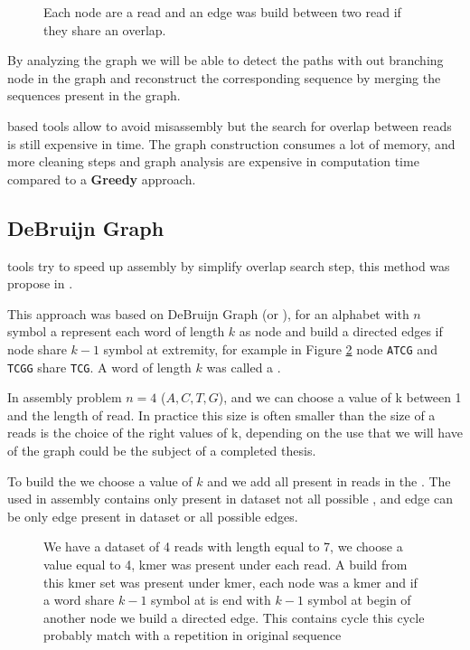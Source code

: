 \documentclass[./main.tex]{subfiles}
\begin{document}
\begin{figure}[ht]
    \centering 
    
    \caption{Each node are a read and an edge was build between two read if they share an overlap.}
    \label{intro:fig:olc:graph}
\end{figure}

By analyzing the graph we will be able to detect the paths with out branching node in the graph and reconstruct the corresponding sequence by merging the sequences present in the graph.

\OLC based tools allow to avoid misassembly but the search for overlap between reads is still expensive in time. The graph construction consumes a lot of memory, and more cleaning steps and graph analysis are expensive in computation time compared to a \textbf{Greedy} approach. 

\subsection{DeBruijn Graph}

\DBG tools try to speed up assembly by simplify overlap search step, this method was propose in \cite{eulerian_approach}.

This approach was based on DeBruijn Graph (or \DBG), for an alphabet with $n$ symbol a \DBG represent each word of length $k$ as node and build a directed edges if node share $k - 1$ symbol at extremity, for example in Figure \ref{intro:fig:dbg:graph} node \texttt{ATCG} and \texttt{TCGG} share \texttt{TCG}. A word of length $k$ was called a \kmer.

In assembly problem $n = 4$ (${A, C, T, G}$), and we can choose a value of k between 1 and the length of read. In practice this size is often smaller than the size of a reads is the choice of the right values of k, depending on the use that we will have of the \DBG graph could be the subject of a completed thesis.

To build the \DBG we choose a value of $k$ and we add all \kmer present in reads in the \DBG. The \DBG used in assembly contains only \kmer present in dataset not all possible \kmer, and edge can be only edge present in dataset or all possible edges.

\begin{figure}[ht]
    \center
    
    \caption{We have a dataset of 4 reads with length equal to 7, we choose a value equal to 4, kmer was present under each read. A \DBG build from this kmer set was present under kmer, each node was a kmer and if a word share $k - 1$ symbol at is end with $k - 1$ symbol at begin of another node we build a directed edge. This \DBG contains cycle this cycle probably match with a repetition in original sequence}
    \label{intro:fig:dbg:graph}
\end{figure}
\end{document}
